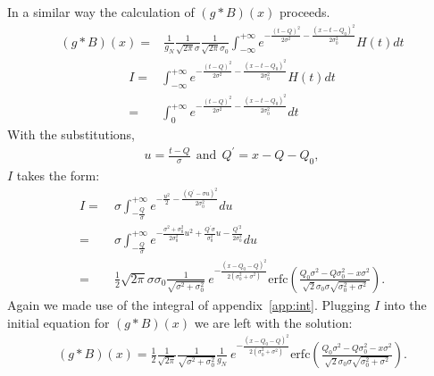 \documentclass[a4paper,11pt]{article}
\begin{document}
In a similar way the calculation of  $(g*B)(x)$ proceeds. 
\begin{align}
(g*B)(x) = & \frac{1 }{g_N}  \frac{1 }{\sqrt{2\pi}\sigma} \frac{1 }{\sqrt{2\pi}\sigma_0} \int^{+\infty}_{ -\infty  }  e^{-\frac{(t-Q)^2}{2\sigma^2} - \frac{(x-t-Q_0)^2}{2\sigma_0^2}} H(t) dt
\end{align}
\begin{align}
I = & \int^{+\infty}_{ -\infty  }  e^{-\frac{(t-Q)^2}{2\sigma^2} - \frac{(x-t-Q_0)^2}{2\sigma_0^2}} H(t) dt \nonumber \\
  = & \int^{+\infty}_{ 0  }  e^{-\frac{(t-Q)^2}{2\sigma^2} - \frac{(x-t-Q_0)^2}{2\sigma_0^2}} dt
\end{align}
With the substitutions,
\begin{align}
u = \frac{t-Q}{\sigma} \ \  \text{and}\  \ Q^\prime = x - Q - Q_0,
\end{align}
$I$ takes the form:
\begin{align}
I = \ & \sigma \int^{+\infty}_{ -\frac{Q}{\sigma}  }  e^{-\frac{u^2}{2} - \frac{(Q^\prime-\sigma u )^2}{2\sigma_0^2}} du \nonumber \\
  = \ & \sigma \int^{+\infty}_{ -\frac{Q}{\sigma}  } e^{-\frac{\sigma^2+\sigma_0^2}{2\sigma_0^2 }u^2 + \frac{Q^\prime\sigma}{\sigma_0^2}u - \frac{Q^{\prime 2}}{2\sigma_0^2}  } du \nonumber \\
  = \ &  \frac{1}{2} \sqrt{2\pi} \sigma \sigma_0 \frac{1}{\sqrt{\sigma^2 +\sigma_0^2}} \ e^{ -\frac{(x-Q_0-Q)^2}{2( \sigma_0^2 + \sigma^2 )}} 
  \text{erfc} 
  \left(    \frac{ Q_0\sigma^2 -Q\sigma_0^2 -x \sigma^2  }{\sqrt{2} \sigma_0\sigma\sqrt{\sigma_0^2 + \sigma^2} }         \right). 
\end{align}
Again we made use of the integral of appendix~\ref{app:int}. 
Plugging $I$ into the initial equation for $(g*B)(x)$ we are left with the solution: 
\begin{align}
(g*B)(x) = \frac{1}{2} \frac{1}{\sqrt{2\pi}} \frac{1}{\sqrt{\sigma^2 +\sigma_0^2}}  \frac{1}{g_N} \ e^{ -\frac{(x-Q_0-Q)^2}{2( \sigma_0^2 + \sigma^2 )}} 
\text{erfc} 
  \left(    \frac{ Q_0\sigma^2 -Q\sigma_0^2 -x \sigma^2  }{\sqrt{2} \sigma_0\sigma\sqrt{\sigma_0^2 + \sigma^2} }         \right). 
\end{align}
\end{document}

